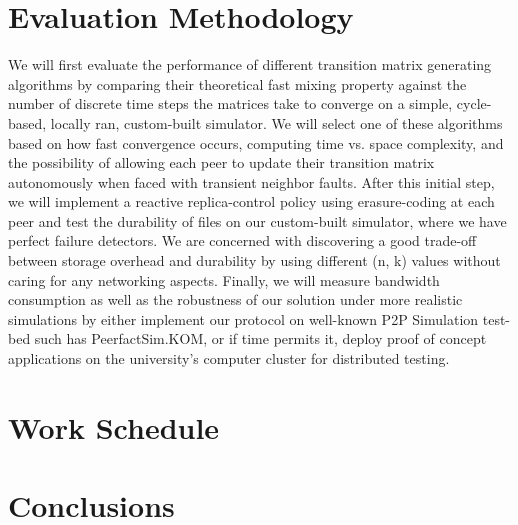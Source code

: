 \documentclass[runningheads]{llncs}
\begin{document}

\section{Evaluation Methodology}\label{sec:methodology}
We will first evaluate the performance of different transition matrix generating algorithms by comparing their theoretical fast mixing property against the number of discrete time steps the matrices take to converge on a simple, cycle-based, locally ran, custom-built simulator. We will select one of these algorithms based on how fast convergence occurs, computing time vs. space complexity, and the possibility of allowing each peer to update their transition matrix autonomously when faced with transient neighbor faults. After this initial step, we will implement a reactive replica-control policy using erasure-coding at each peer and test the durability of files on our custom-built simulator, where we have perfect failure detectors. We are concerned with discovering a good trade-off between storage overhead and durability by using different (n, k) values without caring for any networking aspects. Finally, we will measure bandwidth consumption as well as the robustness of our solution under more realistic simulations by either implement our protocol on well-known P2P Simulation test-bed such has PeerfactSim.KOM\cite{peerfact}, or if time permits it, deploy proof of concept applications on the university's computer cluster for distributed testing.


\section{Work Schedule}\label{sec:workschedule}

\section{Conclusions}\label{sec:conclusion}



\end{document}

